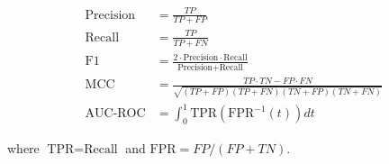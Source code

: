 \documentclass[12pt, letterpaper]{article}
\begin{document}
\begin{appendices}
\begin{align}
\text{Precision} &= \frac{TP}{TP+FP}\label{eq:prec}\\[6pt]
\text{Recall}    &= \frac{TP}{TP+FN}\label{eq:rec}\\[6pt]
\text{F1}        &= \frac{2\cdot\text{Precision}\cdot\text{Recall}}
                         {\text{Precision}+\text{Recall}}\label{eq:f1}\\[6pt]
\text{MCC}       &= \frac{TP\cdot TN-FP\cdot FN}
                    {\sqrt{(TP+FP)(TP+FN)(TN+FP)(TN+FN)}}\label{eq:mcc}\\[6pt]
\text{AUC-ROC}   &= \int_0^1\text{TPR}\!\left(\text{FPR}^{-1}(t)\right)dt
                    \label{eq:auc}
\end{align}

where $\text{TPR}=\text{Recall}$ and $\text{FPR}=FP/(FP+TN)$.

\end{appendices}
\end{document}
